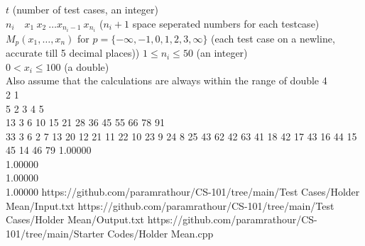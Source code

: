 \documentclass[../../Problems]{subfiles}
\begin{document}
\begin{testcasesMore}
	{$t$ \hfill(number of test cases, an integer)\\
	$n_i\quad x_1\ x_2\ \ldots x_{n_i-1}\ x_{n_i}$ \hfill($n_i+1$ space seperated numbers for each testcase)}
	{$M_{p}(x_{1},\dots ,x_{n})$ for $p=\{-\infty, -1, 0, 1, 2, 3, \infty\}$ \hfill{(each test case on a newline, accurate till 5 decimal places))}}
	{$1 \leq n_i \leq 50$ \hfill{(an integer)}\\
	$0 < x_i \leq 100$ \hfill{(a double)}\\
	Also assume that the calculations are always within the range of double}
	{4\\2 1\\5 2 3 4 5\\13 3 6 10 15 21 28 36 45 55 66 78 91\\33 3 6 2 7 13 20 12 21 11 22 10 23 9 24 8 25 43 62 42 63 41 18 42 17 43 16 44 15 45 14 46 79}
	{1.00000\\1.00000\\1.00000\\1.00000}
	{https://github.com/paramrathour/CS-101/tree/main/Test Cases/Holder Mean/Input.txt}
	{https://github.com/paramrathour/CS-101/tree/main/Test Cases/Holder Mean/Output.txt}
	{https://github.com/paramrathour/CS-101/tree/main/Starter Codes/Holder Mean.cpp}
\end{testcasesMore}
\end{document}
